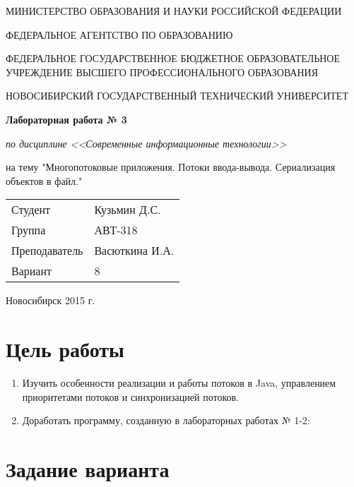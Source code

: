 \documentclass{article}
\begin{document}
\begin{center}
МИНИСТЕРСТВО ОБРАЗОВАНИЯ И НАУКИ РОССИЙСКОЙ ФЕДЕРАЦИИ
\vspace{20pt}

ФЕДЕРАЛЬНОЕ  АГЕНТСТВО  ПО  ОБРАЗОВАНИЮ

ФЕДЕРАЛЬНОЕ  ГОСУДАРСТВЕННОЕ  БЮДЖЕТНОЕ ОБРАЗОВАТЕЛЬНОЕ  УЧРЕЖДЕНИЕ 
ВЫСШЕГО  ПРОФЕССИОНАЛЬНОГО  ОБРАЗОВАНИЯ

НОВОСИБИРСКИЙ  ГОСУДАРСТВЕННЫЙ  ТЕХНИЧЕСКИЙ  УНИВЕРСИТЕТ

\vspace{\fill}
{\bfseries \Large Лабораторная работа № 3}

{\itshape по дисциплине <<Современные информационные технологии>>}

на тему "Многопотоковые приложения. Потоки ввода-вывода.
         Сериализация объектов в файл."

\vspace{\fill}

\begin{flushleft}
\begin{tabular}{ l l }
Студент & Кузьмин Д.С. \\
Группа & АВТ-318 \\
Преподаватель & Васюткина И.А. \\
Вариант & 8 \\
\end{tabular}
\end{flushleft}

\vspace{\fill}
Новосибирск 2015 г.
\end{center}
\pagebreak



\section*{Цель работы}

\begin{enumerate}
\item Изучить особенности реализации и работы потоков в Java, управлением приоритетами потоков и синхронизацией потоков.
\item Доработать программу, созданную в лабораторных работах № 1-2:
\end{enumerate}


\section*{Задание варианта}
\end{document}

